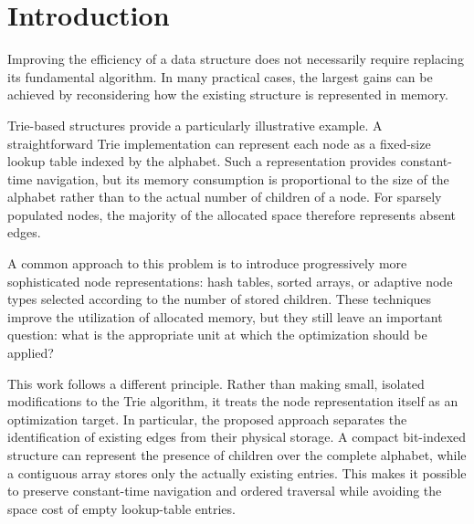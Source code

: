 \documentclass[11pt,twoside]{article}
\begin{document}
    \maketitle




    \section{Introduction}\label{sec1}

    Improving the efficiency of a data structure does not necessarily require replacing its fundamental algorithm.
    In many practical cases, the largest gains can be achieved by reconsidering how the existing structure is
    represented in memory.

    Trie-based structures provide a particularly illustrative example. A straightforward Trie implementation can
    represent each node as a fixed-size lookup table indexed by the alphabet.
    Such a representation provides constant-time navigation, but its memory consumption is proportional to the
    size of the alphabet rather than to the actual number of children of a node. For sparsely populated nodes,
    the majority of the allocated space therefore represents absent edges.

    A common approach to this problem is to introduce progressively more sophisticated node representations: hash
    tables, sorted arrays, or adaptive node types selected according to the number of stored children.
    These techniques improve the utilization of allocated memory, but they still leave an important question:
    what is the appropriate unit at which the optimization should be applied?

    This work follows a different principle. Rather than making small, isolated modifications to the Trie algorithm,
    it treats the node representation itself as an optimization target. In particular, the proposed approach
    separates the identification of existing edges from their physical storage. A compact bit-indexed structure
    can represent the presence of children over the complete alphabet, while a contiguous array stores only
    the actually existing entries. This makes it possible to preserve constant-time navigation and ordered
    traversal while avoiding the space cost of empty lookup-table entries.
\end{document}
